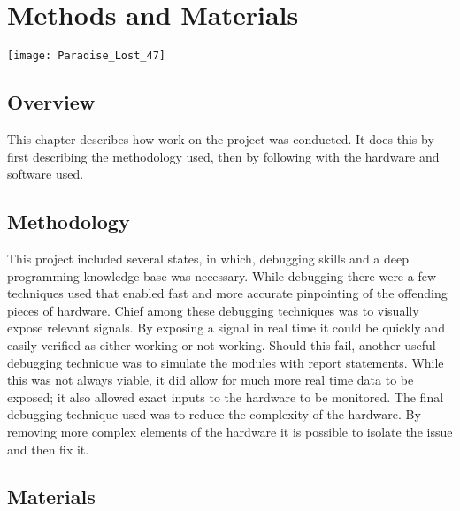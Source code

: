 
\chapter{Methods and Materials} %

\texttt{[image: Paradise\_Lost\_47]}

\label{Chapter 3} %

\section{Overview}

This chapter describes how work on the project was conducted. It does this by first describing the methodology used, then by following with the hardware and software used.


\section{Methodology}

\label{Ch3 Sec1}

This project included several states, in which, debugging skills and a deep programming knowledge base was necessary. While debugging there were a few techniques used that enabled fast and more accurate pinpointing of the offending pieces of hardware. Chief among these debugging techniques was to visually expose relevant signals. By exposing a signal in real time it could be quickly and easily verified as either working or not working. Should this fail, another useful debugging technique was to simulate the modules with report statements. While this was not always viable, it did allow for much more real time data to be exposed; it also allowed exact inputs to the hardware to be monitored. The final debugging technique used was to reduce the complexity of the hardware. By removing more complex elements of the hardware it is possible to isolate the issue and then fix it.

\section{Materials}

